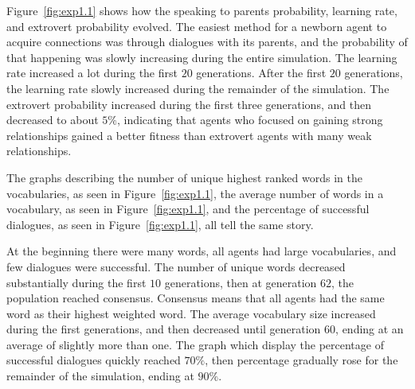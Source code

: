 Figure~\ref{fig:exp1.1} shows how the speaking to parents probability, learning rate, and extrovert probability evolved. The easiest method for a newborn agent to acquire connections was through dialogues with its parents, and the probability of that happening was slowly increasing during the entire simulation. The learning rate increased a lot during the first $20$ generations. After the first $20$ generations, the learning rate slowly increased during the remainder of the simulation. The extrovert probability increased during the first three generations, and then decreased to about $5\%$, indicating that agents who focused on gaining strong relationships gained a better fitness than extrovert agents with many weak relationships.  

The graphs describing the number of unique highest ranked words in the vocabularies, as seen in Figure~\ref{fig:exp1.1}, the average number of words in a vocabulary, as seen in Figure~\ref{fig:exp1.1}, and the percentage of successful dialogues, as seen in Figure~\ref{fig:exp1.1}, all tell the same story. 

At the beginning there were many words, all agents had large vocabularies, and few dialogues were successful. The number of unique words decreased substantially during the first $10$ generations, then at generation $62$, the population reached consensus. Consensus means that all agents had the same word as their highest weighted word. The average vocabulary size increased during the first generations, and then decreased until generation $60$, ending at an average of slightly more than one. The graph which display the percentage of successful dialogues quickly reached $70\%$, then percentage gradually rose for the remainder of the simulation, ending at $90\%$. 

